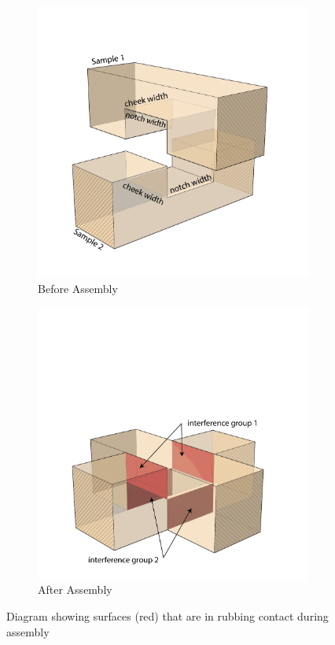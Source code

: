 \begin{figure}
    \centering
    \begin{subfigure}[b]{0.49\textwidth}
        \centering
        \includegraphics[width=\textwidth]{images/04-1+2/tightness-measurement.jpg}
        \caption{Before Assembly}
        \label{fig:lap-joint-assembly-rubbing-before}
    \end{subfigure}
    \hfill
    \begin{subfigure}[b]{0.49\textwidth}
        \centering
        \includegraphics[width=\textwidth]{images/04-1+2/tightness-rubsurface.jpg}
        \caption{After Assembly}
        \label{fig:lap-joint-assembly-rubbing-after}
    \end{subfigure}
    \caption{Diagram showing surfaces (red) that are in rubbing contact during assembly}
    \label{fig:lap-joint-assembly-rubbing}
\end{figure}
